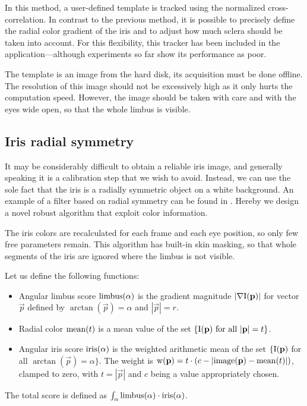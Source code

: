 In this method, a user-defined template is tracked using the normalized cross-correlation.
In contrast to the previous method, it is possible to precisely define the radial color gradient of the iris and to adjust how much sclera should be taken into account.
For this flexibility, this tracker has been included in the application---although experiments so far show its performance as poor.

The template is an image from the hard disk, its acquisition must be done offline.
The resolution of this image should not be excessively high as it only hurts the computation speed.
However, the image should be taken with care and with the eyes wide open, so that the whole limbus is visible.

\subsection{Iris radial symmetry}

It may be considerably difficult to obtain a reliable iris image, and generally speaking it is a calibration step that we wish to avoid.
Instead, we can use the sole fact that the iris is a radially symmetric object on a white background.
An example of a filter based on radial symmetry can be found in \cite{leo14}.
Hereby we design a novel robust algorithm that exploit color information.

The iris colors are recalculated for each frame and each eye position, so only few free parameters remain.
This algorithm has built-in skin masking, so that whole segments of the iris are ignored where the limbus is not visible.

Let us define the following functions:
\begin{itemize}
\item
Angular limbus score $\mathrm{limbus}(\alpha)$ is the gradient magnitude $|\nabla \mathrm{I}(\mathbf{p})|$ for vector $\vec p$ defined by $\arctan(\vec p) = \alpha$ and $|\vec p| = r$.

\item
Radial color $\mathrm{mean}(t)$ is a mean value of the set $\{\mathrm{I}(\mathbf{p}) \text{ for all } |\mathbf{p}| = t \}$.

\item
Angular iris score $\mathrm{iris}(\alpha)$ is the weighted arithmetic mean of the set $\{\mathrm{I}(\mathbf{p})$ for all $\arctan(\vec p) = \alpha \}$.
The weight is $\mathrm{w}(\mathbf{p}) = t \cdot (c - |\mathrm{image}(\mathbf{p}) - \mathrm{mean}(t)|)$, clamped to zero, with $t = |\vec p|$ and $c$ being a value appropriately chosen.

\end{itemize}
The total score is defined as $\int_\alpha \mathrm{limbus}(\alpha) \cdot \mathrm{iris}(\alpha)$.

